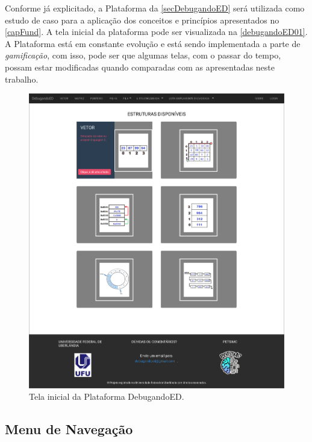 Conforme já explicitado, a Plataforma da \autoref{secDebugandoED} será utilizada como estudo de caso para a aplicação dos conceitos e princípios apresentados no \autoref{capFund}.  A tela inicial da plataforma pode ser visualizada na \autoref{debugandoED01}. A Plataforma está em constante evolução e está sendo implementada a parte de \textit{gamificação}, com isso, pode ser que algumas telas, com o passar do tempo, possam estar modificadas quando comparadas com as apresentadas neste trabalho.

\begin{figure}[ht]
    \begin{center}
        \includegraphics[scale=0.3]{figs/debugandoED01.png}
    \end{center}
    \caption{\label{debugandoED01}Tela inicial da Plataforma DebugandoED.}
\end{figure}


\subsection{Menu de Navegação}
\label{Menu_de_Navegação}

